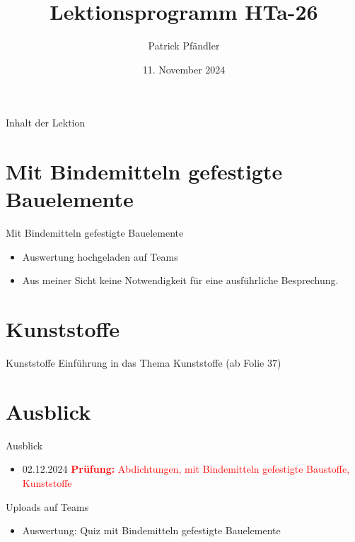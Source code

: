 



\title{\textbf{Lektionsprogramm HTa-26}}
\author{Patrick Pfändler}
\date{11. November 2024}




\frame{\titlepage}

\begin{frame}{Inhalt der Lektion}
    \tableofcontents
\end{frame}


\section{Mit Bindemitteln gefestigte Bauelemente }
\begin{frame}{Mit Bindemitteln gefestigte Bauelemente}
\begin{itemize}
	\item[\textbullet] Auswertung hochgeladen auf Teams 
	\item[] Aus meiner Sicht keine Notwendigkeit für eine ausführliche Besprechung.
\end{itemize}
\end{frame}


\section{Kunststoffe}
\begin{frame}{Kunststoffe}
    Einführung in das Thema Kunststoffe (ab Folie 37)
\end{frame}

\section{Ausblick}
\begin{frame}{Ausblick}
	\begin{itemize}
		\item 02.12.2024 \textcolor{red}{\textbf{Prüfung:} Abdichtungen, mit Bindemitteln gefestigte Baustoffe, Kunststoffe}
	\end{itemize}
\end{frame}

\begin{frame}{Uploads auf Teams}
    \begin{itemize}
        \item Auswertung: Quiz mit Bindemitteln gefestigte Bauelemente
    \end{itemize}
    
\end{frame}

\folieFragen

